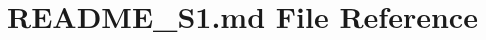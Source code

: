 \hypertarget{README__S1_8md}{}\section{R\+E\+A\+D\+M\+E\+\_\+\+S1.\+md File Reference}
\label{README__S1_8md}
